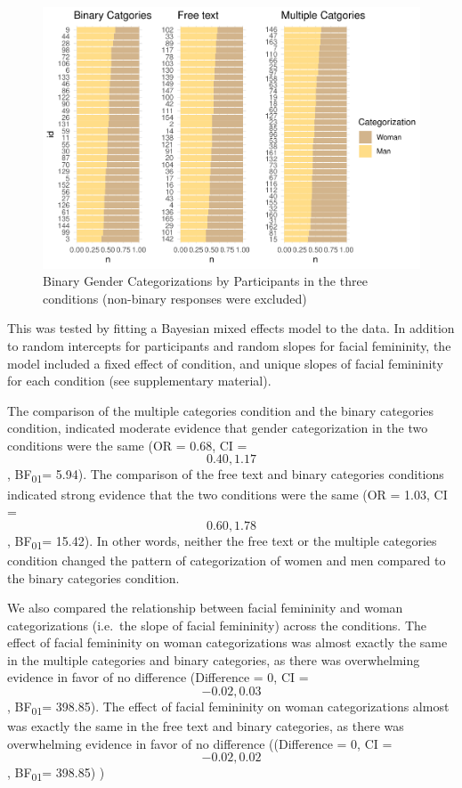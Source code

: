 \documentclass[
  man]{apa7}
\begin{document}
\begin{figure}
\centering
\includegraphics{RO_revisions_doc_files/figure-latex/descriptivesx-1.pdf}
\caption{\label{fig:descriptivesx}Binary Gender Categorizations by Participants in the three conditions (non-binary responses were excluded)}
\end{figure}

This was tested by fitting a Bayesian mixed effects model to the data. In addition to random intercepts for participants and random slopes for facial femininity, the model included a fixed effect of condition, and unique slopes of facial femininity for each condition (see supplementary material).

The comparison of the multiple categories condition and the binary categories condition, indicated moderate evidence that gender categorization in the two conditions were the same (OR = 0.68, CI =\[0.40, 1.17\], BF\textsubscript{01}= 5.94). The comparison of the free text and binary categories conditions indicated strong evidence that the two conditions were the same (OR = 1.03, CI =\[0.60, 1.78\], BF\textsubscript{01}= 15.42). In other words, neither the free text or the multiple categories condition changed the pattern of categorization of women and men compared to the binary categories condition.

We also compared the relationship between facial femininity and woman categorizations (i.e.~the slope of facial femininity) across the conditions. The effect of facial femininity on woman categorizations was almost exactly the same in the multiple categories and binary categories, as there was overwhelming evidence in favor of no difference (Difference = 0, CI =\[-0.02, 0.03\], BF\textsubscript{01}= 398.85). The effect of facial femininity on woman categorizations almost was exactly the same in the free text and binary categories, as there was overwhelming evidence in favor of no difference ((Difference = 0, CI =\[-0.02, 0.02\], BF\textsubscript{01}= 398.85) )
\end{document}
